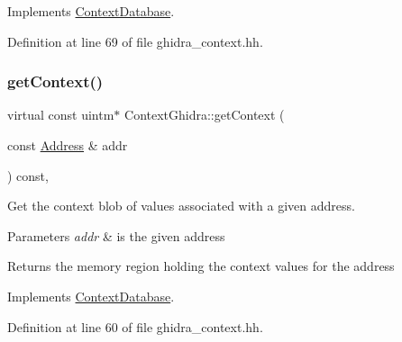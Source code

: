 Implements \mbox{\hyperlink{class_context_database_aba61e2244e4c12105ed5b45a47720808}{Context\+Database}}.



Definition at line 69 of file ghidra\+\_\+context.\+hh.

\mbox{\label{class_context_ghidra_a222fa5ff7a23b1b5242a6be7da1b438f}} 
\subsubsection{\texorpdfstring{getContext()}{getContext()}\hspace{0.1cm}{\footnotesize\ttfamily [1/2]}}
{\footnotesize\ttfamily virtual const uintm$\ast$ Context\+Ghidra\+::get\+Context (\begin{DoxyParamCaption}\item[{const \mbox{\hyperlink{class_address}{Address}} \&}]{addr }\end{DoxyParamCaption}) const\hspace{0.3cm}{\ttfamily [inline]}, {\ttfamily [virtual]}}



Get the context blob of values associated with a given address. 


\begin{DoxyParams}{Parameters}
{\em addr} & is the given address \\
\hline
\end{DoxyParams}
\begin{DoxyReturn}{Returns}
the memory region holding the context values for the address 
\end{DoxyReturn}


Implements \mbox{\hyperlink{class_context_database_a780d39f9c8f7bafe9bbb7eb948d3f9ca}{Context\+Database}}.



Definition at line 60 of file ghidra\+\_\+context.\+hh.

\mbox{\label{class_context_ghidra_a9ea9dfd15af6e45cc089cafeef2e90d7}} 
